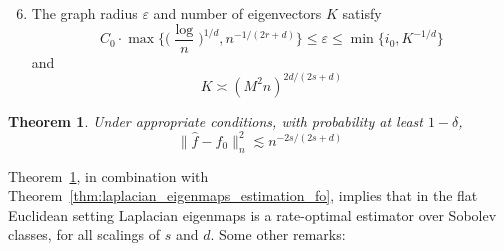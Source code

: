 \documentclass{article}
\newcommand{\1}{\mathbf{1}}
\newcommand{\wh}[1]{\widehat{#1}}
\theoremstyle{alden}
\theoremstyle{aldenthm}
\newtheorem{theorem}{Theorem}
\theoremstyle{definition}
\theoremstyle{remark}
\begin{document}
\begin{enumerate}[label=(A\arabic*)]
	\setcounter{enumi}{5}
	\item 
	\label{asmp:parameters_estimation_ho}
	The graph radius $\varepsilon$ and number of eigenvectors $K$ satisfy
	\begin{equation*}
	C_0 \cdot \max\biggl\{\biggl(\frac{\log}{n}\biggr)^{1/d}, n^{-1/(2r + d)}\biggr\} \leq \varepsilon \leq \min\{i_0, K^{-1/d}\}
	\end{equation*}
	and
	\begin{equation*}
	K \asymp (M^2n)^{2d/(2s + d)}
	\end{equation*}
\end{enumerate}

\begin{theorem}
	\label{thm:laplacian_eigenmaps_estimation_ho}
	Under appropriate conditions, with probability at least $1 - \delta$,
	\begin{equation}
	\label{eqn:laplacian_eigenmaps_estimation_ho}
	\|\wh{f} - f_0\|_n^2 \lesssim n^{-2s/(2s + d)}
	\end{equation}
\end{theorem}
Theorem~\ref{thm:laplacian_eigenmaps_estimation_ho}, in combination with Theorem~\ref{thm:laplacian_eigenmaps_estimation_fo}, implies that in the flat Euclidean setting Laplacian eigenmaps is a rate-optimal estimator over Sobolev classes, for all scalings of $s$ and $d$. Some other remarks:
\end{document}
